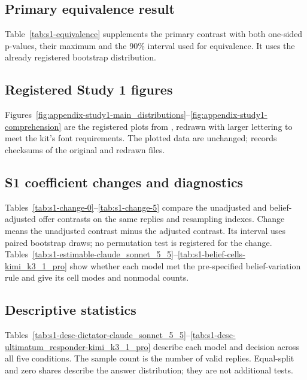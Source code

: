 \subsection{Primary equivalence result}
\label{subapp:primary-equivalence-result}
Table~\ref{tab:s1-equivalence} supplements the primary contrast with both one-sided p-values, their maximum and the 90\% interval used for equivalence. It uses the already registered bootstrap distribution.

\subsection{Registered Study 1 figures}
\label{subapp:registered-study-1-figures}
Figures~\ref{fig:appendix-study1-main_distributions}--\ref{fig:appendix-study1-comprehension} are the registered plots from , redrawn with larger lettering to meet the kit's font requirements. The plotted data are unchanged;  records checksums of the original and redrawn files.





\subsection{S1 coefficient changes and diagnostics}
\label{subapp:s1-coefficient-changes-and-diagnostics}
Tables~\ref{tab:s1-change-0}--\ref{tab:s1-change-5} compare the unadjusted and belief-adjusted offer contrasts on the same replies and resampling indexes. Change means the unadjusted contrast minus the adjusted contrast. Its interval uses paired bootstrap draws; no permutation test is registered for the change. Tables~\ref{tab:s1-estimable-claude_sonnet_5_5}--\ref{tab:s1-belief-cells-kimi_k3_1_pro} show whether each model met the pre-specified belief-variation rule and give its cell modes and nonmodal counts.



\subsection{Descriptive statistics}
\label{subapp:descriptive-statistics}
Tables~\ref{tab:s1-desc-dictator-claude_sonnet_5_5}--\ref{tab:s1-desc-ultimatum_responder-kimi_k3_1_pro} describe each model and decision across all five conditions. The sample count is the number of valid replies. Equal-split and zero shares describe the answer distribution; they are not additional tests.


